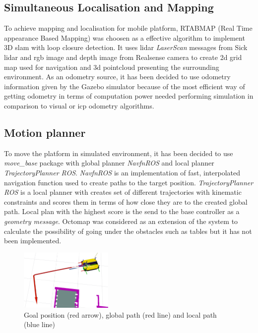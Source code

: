 \documentclass[conference,a4paper]{IEEEtran}
\begin{document}
\subsection{Simultaneous Localisation and Mapping}
To achieve mapping and localisation for mobile platform, RTABMAP (Real Time appearance Based Mapping) \cite{RTABMAP} was choosen as a effective algorithm to implement 3D slam with loop closure detection. It uses lidar \textit{LaserScan} messages from Sick lidar and rgb image and depth image from Realsense camera to create 2d grid map used for navigation and 3d pointcloud presenting the surrounding environment. 
As an odometry source, it has been decided to use odometry information given by the Gazebo simulator because of the most efficient way of getting odometry in terms of computation power needed performing simulation in comparison to visual or icp odometry algorithms.

\subsection{Motion planner}
To move the platform in simulated environment, it has been decided to use \textit{move\_base} package with global planner \textit{NavfnROS} and local planner \textit{TrajectoryPlanner ROS}. \textit{NavfnROS} is an implementation of fast, interpolated navigation function used to create paths to the target position.  \textit{TrajectoryPlanner ROS} is a local planner with creates set of different trajectories with kinematic constraints
and scores them in terms of how close they are to the created global path. Local plan with the highest score is the send to the base controller as a \textit{geometry message}.
Octomap was considered as an extension of the system to calculate the possibility of going under the obstacles such as tables but it has not been implemented. 

\begin{figure}[ht]
  \centering
  \includegraphics[width=0.4\textwidth]{img/global_local_planner.png}
  \caption[global and local path]{Goal position (red arrow), global path (red line) and local path (blue line)}
\end{figure}
\FloatBarrier
\end{document}
